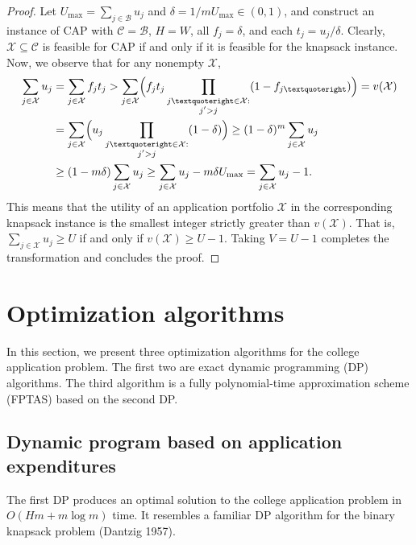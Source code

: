 \documentclass[11pt]{article} %
\theoremstyle{definition}
\begin{document}
\begin{proof}
Let $U_{\mathrm{max}} = \sum_{j \in \mathcal{B}} u_j$ and $\delta = {1} /{m U_{\mathrm{max}}} \in (0, 1)$, and construct an instance of CAP with $\mathcal{C} = \mathcal{B}$, $H = W$, all $f_j = \delta$, and each $t_j = u_j / \delta$. Clearly, $\mathcal{X} \subseteq \mathcal{C}$ is feasible for CAP if and only if it is feasible for the knapsack instance. Now, we observe that for any nonempty $\mathcal{X}$,
\begin{align}
\begin{split}
\sum_{j \in \mathcal{X}} u_j &=  \sum_{j \in \mathcal{X}} f_j t_j
> \sum_{j \in \mathcal{X}} \Bigl( f_j t_j \prod_{\substack{j’ \in \mathcal{X}: \\ j' > j}} (1 - f_{j’}) \Bigr)
= v(\mathcal{X}) \\
&= \sum_{j \in \mathcal{X}} \Bigl( u_j  \prod_{\substack{j’ \in \mathcal{X}: \\ j' > j}} (1 - \delta) \Bigr)
\geq (1 - \delta)^m \sum_{j \in \mathcal{X}} u_j \\
&\geq (1 - m\delta) \sum_{j \in \mathcal{X}} u_j 
\geq \sum_{j \in \mathcal{X}} u_j  - m\delta U_{\mathrm{max}}
= \sum_{j \in \mathcal{X}} u_j  - 1.
\end{split}
\end{align}
This means that the utility of an application portfolio $\mathcal{X}$ in the corresponding knapsack instance is the smallest integer strictly greater than $v( \mathcal{X})$. That is, $\sum_{j \in \mathcal{X}} u_j \geq U$ if and only if $v(\mathcal{X}) \geq U -1$. Taking $V = U-1$ completes the transformation and concludes the proof. 
\end{proof}






\section{Optimization algorithms} \label{sectionAlgos}

In this section, we present three optimization algorithms for the college application problem. The first two are exact dynamic programming (DP) algorithms. The third algorithm is a fully polynomial-time approximation scheme (FPTAS) based on the second DP.



\subsection{Dynamic program based on application expenditures}
The first DP produces an optimal solution to the college application problem in $O(Hm + m\log m)$ time. It resembles a familiar DP algorithm for the binary knapsack problem (Dantzig 1957).
\end{document}
